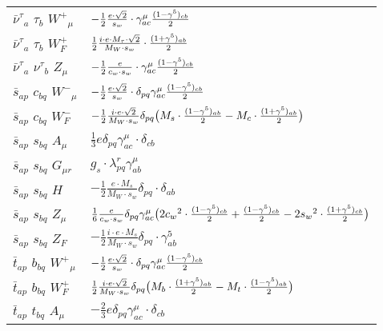 \begin{center}
\begin{tabular}{|l|l|}
$\bar{\nu}^\tau{}_{a }$ \phantom{-} $\tau{}_{b }$ \phantom{-} $W^+{}_{\mu }$ \phantom{-}  &
	$-\frac{1}{2}\frac{ e \cdot\sqrt{2}}{ s_w}\cdot \gamma_{a c}^\mu {(1-\gamma^5)_{c b}\over 2} $\\[2mm]
$\bar{\nu}^\tau{}_{a }$ \phantom{-} $\tau{}_{b }$ \phantom{-} $W^+_F{}_{}$ \phantom{-}  &
	$\frac{1}{2}\frac{ i \cdot e \cdot M_{\tau} \cdot\sqrt{2}}{ M_W \cdot s_w}\cdot {(1+\gamma^5)_{a b}\over 2} $\\[2mm]
$\bar{\nu}^\tau{}_{a }$ \phantom{-} $\nu^\tau{}_{b }$ \phantom{-} ${Z}_{\mu }$ \phantom{-}  &
	$-\frac{1}{2}\frac{ e}{ c_w \cdot s_w}\cdot \gamma_{a c}^\mu {(1-\gamma^5)_{c b}\over 2} $\\[2mm]
$\bar{s}{}_{a p }$ \phantom{-} $c{}_{b q }$ \phantom{-} $W^-{}_{\mu }$ \phantom{-}  &
	$-\frac{1}{2}\frac{ e \cdot\sqrt{2}}{ s_w}\cdot \delta_{p q} \gamma_{a c}^\mu {(1-\gamma^5)_{c b}\over 2} $\\[2mm]
$\bar{s}{}_{a p }$ \phantom{-} $c{}_{b q }$ \phantom{-} $W^-_F{}_{}$ \phantom{-}  &
	$-\frac{1}{2}\frac{ i \cdot e \cdot\sqrt{2}}{ M_W \cdot s_w}\delta_{p q} \big( M_s\cdot {(1-\gamma^5)_{a b}\over 2} - M_c\cdot {(1+\gamma^5)_{a b}\over 2} \big)$\\[2mm]
$\bar{s}{}_{a p }$ \phantom{-} $s{}_{b q }$ \phantom{-} ${A}_{\mu }$ \phantom{-}  &
	$\frac{1}{3} e\delta_{p q} \gamma_{a c}^\mu \cdot \delta_{c b} $\\[2mm]
$\bar{s}{}_{a p }$ \phantom{-} $s{}_{b q }$ \phantom{-} ${G}_{\mu r }$ \phantom{-}  &
	$ g_s\cdot \lambda_{p q}^r \gamma_{a b}^\mu $\\[2mm]
$\bar{s}{}_{a p }$ \phantom{-} $s{}_{b q }$ \phantom{-} ${H}_{}$ \phantom{-}  &
	$-\frac{1}{2}\frac{ e \cdot M_s}{ M_W \cdot s_w}\delta_{p q} \cdot \delta_{a b} $\\[2mm]
$\bar{s}{}_{a p }$ \phantom{-} $s{}_{b q }$ \phantom{-} ${Z}_{\mu }$ \phantom{-}  &
	$\frac{1}{6}\frac{ e}{ c_w \cdot s_w}\delta_{p q} \gamma_{a c}^\mu \big(2 c_w{}^2 \cdot {(1-\gamma^5)_{c b}\over 2} +{(1-\gamma^5)_{c b}\over 2} -2 s_w{}^2 \cdot {(1+\gamma^5)_{c b}\over 2} \big)$\\[2mm]
$\bar{s}{}_{a p }$ \phantom{-} $s{}_{b q }$ \phantom{-} $Z_F{}_{}$ \phantom{-}  &
	$-\frac{1}{2}\frac{ i \cdot e \cdot M_s}{ M_W \cdot s_w}\delta_{p q} \cdot \gamma_{a b}^5 $\\[2mm]
$\bar{t}{}_{a p }$ \phantom{-} $b{}_{b q }$ \phantom{-} $W^+{}_{\mu }$ \phantom{-}  &
	$-\frac{1}{2}\frac{ e \cdot\sqrt{2}}{ s_w}\cdot \delta_{p q} \gamma_{a c}^\mu {(1-\gamma^5)_{c b}\over 2} $\\[2mm]
$\bar{t}{}_{a p }$ \phantom{-} $b{}_{b q }$ \phantom{-} $W^+_F{}_{}$ \phantom{-}  &
	$\frac{1}{2}\frac{ i \cdot e \cdot\sqrt{2}}{ M_W \cdot s_w}\delta_{p q} \big( M_b\cdot {(1+\gamma^5)_{a b}\over 2} - M_t\cdot {(1-\gamma^5)_{a b}\over 2} \big)$\\[2mm]
$\bar{t}{}_{a p }$ \phantom{-} $t{}_{b q }$ \phantom{-} ${A}_{\mu }$ \phantom{-}  &
	$-\frac{2}{3} e\delta_{p q} \gamma_{a c}^\mu \cdot \delta_{c b} $\\ \hline
\end{tabular}


\end{center}
